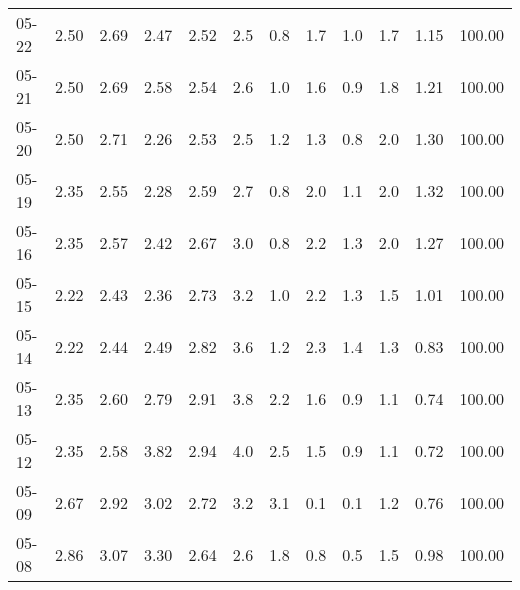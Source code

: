\begin{threeparttable}
{\begin{tabular}{lrrrrrrrrrrr}
  05-22 &          2.50 &          2.69 &          2.47 &        2.52 &                 2.5 &                 0.8 &        1.7 &                 1.0 &              1.7 &            1.15 &                 100.00 \\
  05-21 &          2.50 &          2.69 &          2.58 &        2.54 &                 2.6 &                 1.0 &        1.6 &                 0.9 &              1.8 &            1.21 &                 100.00 \\
  05-20 &          2.50 &          2.71 &          2.26 &        2.53 &                 2.5 &                 1.2 &        1.3 &                 0.8 &              2.0 &            1.30 &                 100.00 \\
  05-19 &          2.35 &          2.55 &          2.28 &        2.59 &                 2.7 &                 0.8 &        2.0 &                 1.1 &              2.0 &            1.32 &                 100.00 \\
  05-16 &          2.35 &          2.57 &          2.42 &        2.67 &                 3.0 &                 0.8 &        2.2 &                 1.3 &              2.0 &            1.27 &                 100.00 \\
  05-15 &          2.22 &          2.43 &          2.36 &        2.73 &                 3.2 &                 1.0 &        2.2 &                 1.3 &              1.5 &            1.01 &                 100.00 \\
  05-14 &          2.22 &          2.44 &          2.49 &        2.82 &                 3.6 &                 1.2 &        2.3 &                 1.4 &              1.3 &            0.83 &                 100.00 \\
  05-13 &          2.35 &          2.60 &          2.79 &        2.91 &                 3.8 &                 2.2 &        1.6 &                 0.9 &              1.1 &            0.74 &                 100.00 \\
  05-12 &          2.35 &          2.58 &          3.82 &        2.94 &                 4.0 &                 2.5 &        1.5 &                 0.9 &              1.1 &            0.72 &                 100.00 \\
  05-09 &          2.67 &          2.92 &          3.02 &        2.72 &                 3.2 &                 3.1 &        0.1 &                 0.1 &              1.2 &            0.76 &                 100.00 \\
  05-08 &          2.86 &          3.07 &          3.30 &        2.64 &                 2.6 &                 1.8 &        0.8 &                 0.5 &              1.5 &            0.98 &                 100.00 \\

\end{tabular}}
\end{threeparttable}
